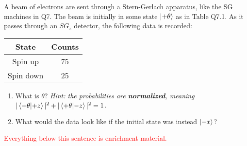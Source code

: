 \documentclass{article}
\begin{document}
    \begin{tcolorbox}[colframe=blue!50!black, arc=2mm, title=\textsc{Practice 2}]
        A beam of electrons are sent through a Stern-Gerlach apparatus, like the SG machines in Q7. The beam is initially in some state $\ket{+\theta}$ as in Table Q7.1. As it passes through an $SG_z$ detector, the following data is recorded:
        \begin{center}
        \begin{tabular}{|c|c|}
        \hline
        \textbf{State} & \textbf{Counts} \\
        \hline
        Spin up & 75 \\
        Spin down & 25 \\
        \hline
        \end{tabular}
        \end{center}
        \begin{enumerate}[label=\alph*)]
            \item What is $\theta$? \textit{Hint: the probabilities are \textbf{normalized}, meaning $|\braket{+\theta}{+z}|^2 + |\braket{+\theta}{-z}|^2 =1$.}
            \item What would the data look like if the initial state was instead $\ket{-x}$?
        \end{enumerate}
    \end{tcolorbox}


    

    \vspace{1em}

    \textcolor{red}{Everything below this sentence is enrichment material.}
\end{document}
